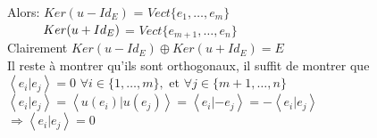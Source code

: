 \documentclass{article}
\newcommand\tab[1][1cm]{\hspace*{#1}}
\newcommand{\scalaire}[2]{\left< #1 | #2\right>}
\begin{document}
Alors: $Ker(u - Id_E)$ = $Vect\{e_1, \dots, e_m\}$\\
$\tab[1cm] Ker(u + Id_E)$ = $Vect\{e_{m + 1}, \dots, e_n\}$\\
Clairement $Ker(u - Id_E) \oplus Ker(u + Id_E) = E$\\
Il reste à montrer qu'ils sont orthogonaux, il suffit de montrer que\\
$\scalaire{e_i}{e_j} = 0$ \tab $\forall i \in \{1, \dots, m\}, \mbox{ et } \forall j \in \{m + 1, \dots, n\}$\\
$\scalaire{e_i}{e_j} = \scalaire{u(e_i)}{u(e_j)} = \scalaire{e_i}{-e_j} = -\scalaire{e_i}{e_j}$\\
$\Rightarrow \scalaire{e_i}{e_j} = 0$

\end{document}
